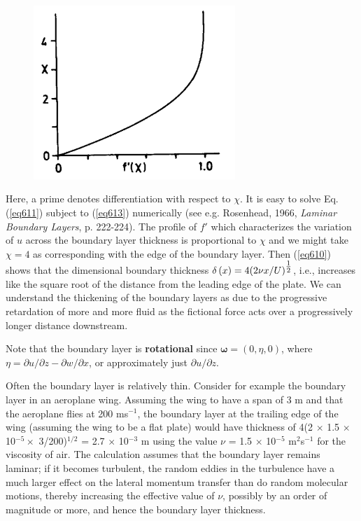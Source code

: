\documentclass[twoside,a4paper,11pt]{report}
\begin{document}
\begin{figure}
\centerline{\includegraphics[width=3in]{Section62.pdf}}
\label{fig2}
\end{figure}

Here, a prime denotes differentiation with respect to $\chi $. It is easy to 
solve Eq. (\ref{eq611}) subject to (\ref{eq613}) numerically (see e.g. Rosenhead, 1966, 
\textit{Laminar Boundary Layers}, p. 222-224). The profile of $f'$ which characterizes the variation of $u$ 
across the boundary layer thickness is proportional to $\chi $ and we might 
take $\chi  = 4$ as corresponding with the edge of the boundary layer. Then 
(\ref{eq610}) shows that the dimensional boundary thickness $\delta \left( x 
\right)=4(2\nu x/ U)^{\textstyle{1 \over 2}}$, i.e., 
increases like the square root of the distance from the leading edge of the 
plate. We can understand the thickening of the boundary layers as due to the 
progressive retardation of more and more fluid as the fictional force acts 
over a progressively longer distance downstream.

Note that the boundary layer is \textbf{rotational} since ${\bm\omega}
= (0, \eta , 0)$, where $\eta ={\partial u} / {\partial 
z-}{\partial w}/{\partial x}$, or approximately just 
${\partial u}/ {\partial z}$. 

Often the boundary layer is relatively thin. Consider for example the 
boundary layer in an aeroplane wing. Assuming the wing to have a span of 3 m 
and that the aeroplane flies at 200 ms$^{-1}$, the boundary layer at the 
trailing edge of the wing (assuming the wing to be a flat plate) would have 
thickness of 4(2 $\times $ 1.5 $\times $ 10$^{-5 }\times $ 3/200)$^{1/2}$ 
= 2.7 $\times $ 10$^{-3}$ m using the value $\nu $ = 1.5 $\times $ 10$^{-5}$ 
m$^{2}$s$^{-1}$ for the viscosity of air. The calculation assumes that the 
boundary layer remains laminar; if it becomes turbulent, the random eddies 
in the turbulence have a much larger effect on the lateral momentum transfer 
than do random molecular motions, thereby increasing the effective value of 
$\nu $, possibly by an order of magnitude or more, and hence the boundary 
layer thickness.
\end{document}
